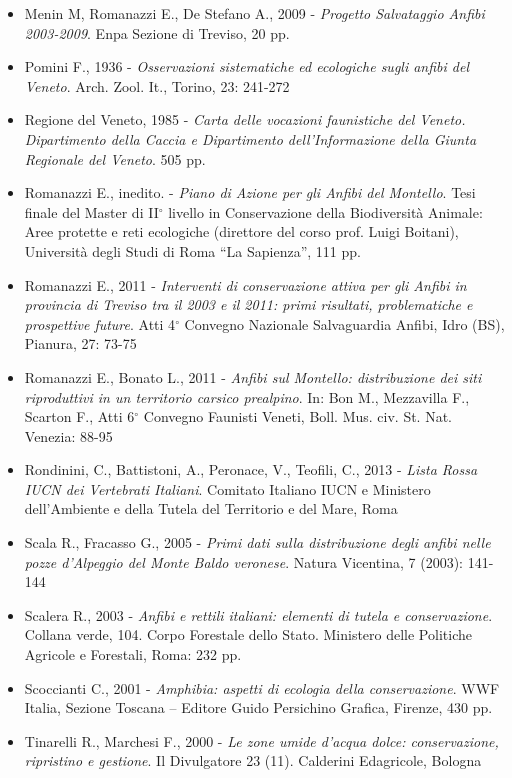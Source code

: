 \documentclass[11pt,a4paper,twoside]{memoir}
\begin{document}
\begin{itemize}
\item Menin M, Romanazzi E., De Stefano A., 2009 - \emph{Progetto Salvataggio Anfibi 2003-2009}. Enpa Sezione di Treviso, 20 pp.
\item Pomini F., 1936 - \emph{Osservazioni sistematiche ed ecologiche sugli anfibi del Veneto}. Arch. Zool. It., Torino, 23: 241-272
\item Regione del Veneto, 1985 - \emph{Carta delle vocazioni faunistiche del Veneto. Dipartimento della Caccia e Dipartimento dell’Informazione della Giunta Regionale del Veneto}. 505 pp.
\item Romanazzi E., inedito. - \emph{Piano di Azione per gli Anfibi del Montello}. Tesi finale del Master di II$^\circ$ livello in Conservazione della Biodiversità Animale: Aree protette e reti ecologiche (direttore del corso prof. Luigi Boitani), Università degli Studi di Roma “La Sapienza”,  111 pp.
\item Romanazzi E., 2011 - \emph{Interventi di conservazione attiva per gli Anfibi in provincia di Treviso tra il 2003 e il 2011: primi risultati, problematiche e prospettive future}. Atti 4$^\circ$ Convegno Nazionale Salvaguardia Anfibi, Idro (BS), Pianura, 27: 73-75
\item Romanazzi E., Bonato L., 2011 - \emph{Anfibi sul Montello: distribuzione dei siti riproduttivi in un territorio carsico prealpino}. In: Bon M., Mezzavilla F., Scarton F., Atti 6$^\circ$ Convegno Faunisti Veneti, Boll. Mus. civ. St. Nat. Venezia: 88-95
\item Rondinini, C., Battistoni, A., Peronace, V., Teofili, C., 2013 - \emph{Lista Rossa IUCN dei Vertebrati Italiani}. Comitato Italiano IUCN e Ministero dell’Ambiente e della Tutela del Territorio e del Mare, Roma
\item Scala R., Fracasso G., 2005 - \emph{Primi dati sulla distribuzione degli anfibi nelle pozze d'Alpeggio del Monte Baldo veronese}. Natura Vicentina, 7 (2003): 141-144
\item Scalera R., 2003 - \emph{Anfibi e rettili italiani: elementi di tutela e conservazione}. Collana verde, 104. Corpo Forestale dello Stato. Ministero delle Politiche Agricole e Forestali, Roma: 232 pp. 
\item Scoccianti C., 2001 - \emph{\emph{Amphibia}: aspetti di ecologia della conservazione}. WWF Italia, Sezione Toscana – Editore Guido Persichino Grafica, Firenze,  430 pp.
\item Tinarelli R., Marchesi F., 2000 - \emph{Le zone umide d’acqua dolce: conservazione, ripristino e gestione}. Il Divulgatore 23 (11). Calderini Edagricole, Bologna
\end{itemize}
\end{document}

